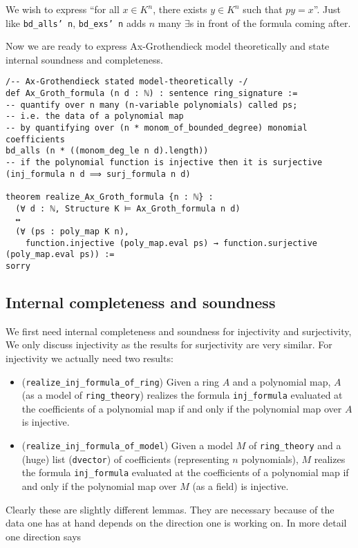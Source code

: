 We wish to express ``for all $x \in K^{n}$, there exists $y \in K^{n}$ such that $p y = x$''.
Just like \texttt{bd\_alls' n}, \texttt{bd\_exs' n} adds $n$ many $\exists$s in front of the
formula coming after.

Now we are ready to express Ax-Grothendieck model theoretically and state internal
soundness and completeness.
\begin{lstlisting}
/-- Ax-Grothendieck stated model-theoretically -/
def Ax_Groth_formula (n d : ℕ) : sentence ring_signature :=
-- quantify over n many (n-variable polynomials) called ps;
-- i.e. the data of a polynomial map
-- by quantifying over (n * monom_of_bounded_degree) monomial coefficients
bd_alls (n * ((monom_deg_le n d).length))
-- if the polynomial function is injective then it is surjective
(inj_formula n d ⟹ surj_formula n d)

theorem realize_Ax_Groth_formula {n : ℕ} :
  (∀ d : ℕ, Structure K ⊨ Ax_Groth_formula n d)
  ↔
  (∀ (ps : poly_map K n),
    function.injective (poly_map.eval ps) → function.surjective (poly_map.eval ps)) :=
sorry
\end{lstlisting}

\subsection{Internal completeness and soundness}

We first need internal completeness and soundness for injectivity and surjectivity,
We only discuss injectivity as the results for surjectivity are very similar.
For injectivity we actually need two results:
\begin{itemize}
  \item (\texttt{realize\_inj\_formula\_of\_ring})
    Given a ring $A$ and a polynomial map,
    $A$ (as a model of \texttt{ring\_theory})
    realizes the formula \texttt{inj\_formula} evaluated at the coefficients
    of a polynomial map if and only if the polynomial map over $A$ is injective.
  \item (\texttt{realize\_inj\_formula\_of\_model})
    Given a model $M$ of \texttt{ring\_theory} and a (huge) list
    (\texttt{dvector}) of coefficients (representing $n$ polynomials),
    $M$ realizes the formula
    \texttt{inj\_formula} evaluated at the coefficients of a polynomial map
    if and only if the polynomial map over $M$ (as a field) is injective.
\end{itemize}

Clearly these are slightly different lemmas.
They are necessary because of the data one has at hand
depends on the direction one is working on.
In more detail one direction says

